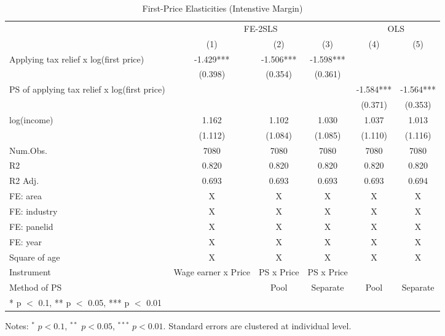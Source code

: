 \documentclass[
  11pt,
  a4paper,
]{article}
\begin{document}
\begin{table}

\caption{\label{tab:intensive}First-Price Elasticities (Intenstive Margin)}
\centering
\fontsize{9}{11}\selectfont
\begin{threeparttable}
\begin{tabular}[t]{lccccc}
\toprule
\multicolumn{1}{c}{ } & \multicolumn{3}{c}{FE-2SLS} & \multicolumn{2}{c}{OLS} \\
\cmidrule(l{3pt}r{3pt}){2-4} \cmidrule(l{3pt}r{3pt}){5-6}
  & (1) & (2) & (3) & (4) & (5)\\
\midrule
Applying tax relief x log(first price) & -1.429*** & -1.506*** & -1.598*** &  & \\
 & (0.398) & (0.354) & (0.361) &  & \\
PS of applying tax relief x log(first price) &  &  &  & -1.584*** & -1.564***\\
 &  &  &  & (0.371) & (0.353)\\
log(income) & 1.162 & 1.102 & 1.030 & 1.037 & 1.013\\
 & (1.112) & (1.084) & (1.085) & (1.110) & (1.116)\\
\midrule
Num.Obs. & 7080 & 7080 & 7080 & 7080 & 7080\\
R2 & 0.820 & 0.820 & 0.820 & 0.820 & 0.820\\
R2 Adj. & 0.693 & 0.693 & 0.693 & 0.693 & 0.694\\
FE: area & X & X & X & X & X\\
FE: industry & X & X & X & X & X\\
FE: panelid & X & X & X & X & X\\
FE: year & X & X & X & X & X\\
Square of age & X & X & X & X & X\\
Instrument & Wage earner x Price & PS x Price & PS x Price &  & \\
Method of PS &  & Pool & Separate & Pool & Separate\\
\bottomrule
\multicolumn{6}{l}{\rule{0pt}{1em}* p $<$ 0.1, ** p $<$ 0.05, *** p $<$ 0.01}\\
\end{tabular}
\begin{tablenotes}
\item Notes: $^{*}$ $p < 0.1$, $^{**}$ $p < 0.05$, $^{***}$ $p < 0.01$. Standard errors are clustered at individual level.
\end{tablenotes}
\end{threeparttable}
\end{table}
\end{document}
